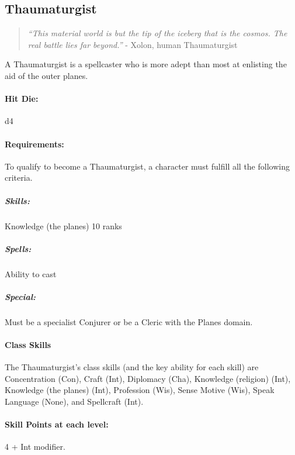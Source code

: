\subsection{Thaumaturgist}
\begin{quote}
\emph{``This material world is but the tip of the iceberg that is the cosmos. The real battle lies far beyond.''}
- Xolon, human Thaumaturgist
\end{quote}
A Thaumaturgist is a spellcaster who is more adept than most at enlisting the aid of the outer planes.
\paragraph{Hit Die:} d4
\paragraph{Requirements:}
To qualify to become a Thaumaturgist, a character must fulfill all the following criteria.
\subparagraph{Skills:} Knowledge (the planes) 10 ranks 
\subparagraph{Spells:} Ability to cast 
\subparagraph{Special:} Must be a specialist Conjurer or be a Cleric with the Planes domain.
\paragraph{Class Skills}
The Thaumaturgist's class skills (and the key ability for each skill) are Concentration (Con), Craft (Int), Diplomacy (Cha), Knowledge (religion) (Int), Knowledge (the planes) (Int), Profession (Wis), Sense Motive (Wis), Speak Language (None), and Spellcraft (Int).
\paragraph{Skill Points at each level:} 4 + Int modifier.
\begin{table*}
\centering
\caption{The Thaumaturgist}
\label{tab:Thaumaturgist}
\end{table*}
